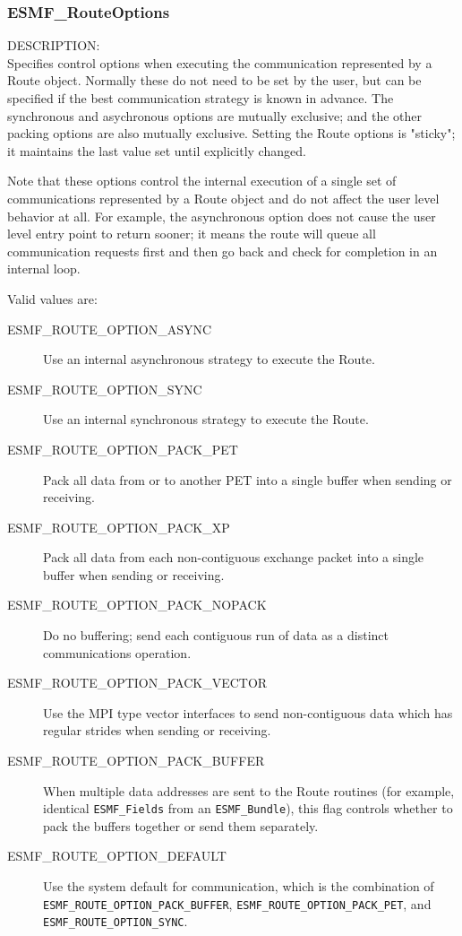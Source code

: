 
\subsubsection{ESMF\_RouteOptions}

\label{opt:routeopt}
{\sf DESCRIPTION:\\}
Specifies control options when executing the communication
represented by a Route object.  Normally these do not need to
be set by the user, but can be specified if the best communication strategy
is known in advance.   The synchronous and asychronous options 
are mutually exclusive; and the other packing options are also
mutually exclusive.  Setting the Route options is "sticky"; it
maintains the last value set until explicitly changed.

Note that these options control the internal execution of a single
set of communications represented by a Route object and do not affect
the user level behavior at all.  For example,
the asynchronous option does not cause the user level entry point to
return sooner; it means the route will queue all communication requests
first and then go back and check for completion in an internal loop.

Valid values are:
\begin{description}
    \item [ESMF\_ROUTE\_OPTION\_ASYNC]
	Use an internal asynchronous strategy to execute the Route.
    \item [ESMF\_ROUTE\_OPTION\_SYNC]
	Use an internal synchronous strategy to execute the Route.
    \item [ESMF\_ROUTE\_OPTION\_PACK\_PET]
        Pack all data from or to another PET into a single buffer
        when sending or receiving.
    \item [ESMF\_ROUTE\_OPTION\_PACK\_XP]
        Pack all data from each non-contiguous exchange packet 
        into a single buffer when sending or receiving.
    \item [ESMF\_ROUTE\_OPTION\_PACK\_NOPACK]
        Do no buffering; send each contiguous run of data as a distinct
        communications operation.
    \item [ESMF\_ROUTE\_OPTION\_PACK\_VECTOR]
        Use the MPI type vector interfaces to send non-contiguous data
        which has regular strides when sending or receiving.
    \item [ESMF\_ROUTE\_OPTION\_PACK\_BUFFER]
        When multiple data addresses are sent to the Route routines (for
        example, identical {\tt ESMF\_Fields} from an {\tt ESMF\_Bundle}),
        this flag controls whether to pack the buffers together or send
        them separately.  
    \item [ESMF\_ROUTE\_OPTION\_DEFAULT]
	Use the system default for communication, which is the combination of 
        {\tt ESMF\_ROUTE\_OPTION\_PACK\_BUFFER},
        {\tt ESMF\_ROUTE\_OPTION\_PACK\_PET}, and
        {\tt ESMF\_ROUTE\_OPTION\_SYNC}.
\end{description}







